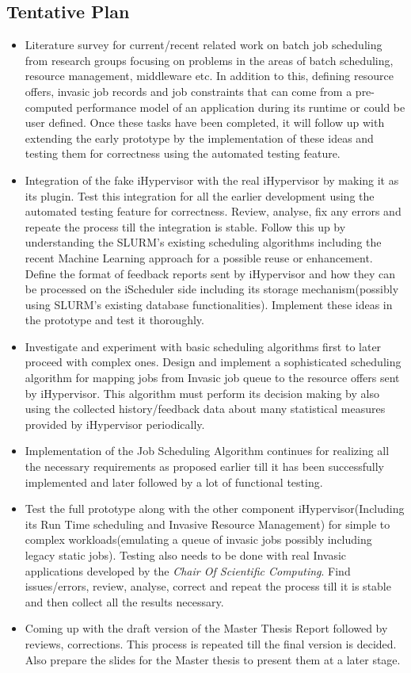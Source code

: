 \subsection{Tentative Plan}
\begin{itemize}
\item Literature survey for current/recent related work on batch job scheduling from research groups focusing on problems in the areas of batch scheduling, resource management, middleware etc. In addition to this, defining resource offers, invasic job records and job constraints that can come from a pre-computed performance model of an application during its runtime or could be user defined. Once these tasks have been completed, it will follow up with extending the early prototype by the implementation of these ideas and testing them for correctness using the automated testing feature.
\item Integration of the fake iHypervisor with the real iHypervisor by making it as its plugin. Test this integration for all the earlier development using the automated testing feature for correctness. Review, analyse, fix any errors and repeate the process till the integration is stable. Follow this up by understanding the SLURM's existing scheduling algorithms including the recent Machine Learning approach for a possible reuse or enhancement. Define the format of feedback reports sent by iHypervisor and how they can be processed on the iScheduler side including its storage mechanism(possibly using SLURM's existing database functionalities). Implement these ideas in the prototype and test it thoroughly.
\item Investigate and experiment with basic scheduling algorithms first to later proceed with complex ones. Design and implement a sophisticated scheduling algorithm for mapping jobs from Invasic job queue to the resource offers sent by iHypervisor. This algorithm must perform its decision making by also using the collected history/feedback data about many statistical measures provided by iHypervisor periodically.
\item Implementation of the Job Scheduling Algorithm continues for realizing all the necessary requirements as proposed earlier till it has been successfully implemented and later followed by a lot of functional testing.
\item Test the full prototype along with the other component iHypervisor(Including its Run Time scheduling and Invasive Resource Management) for simple to complex workloads(emulating a queue of invasic jobs possibly including legacy static jobs). Testing also needs to be done with real Invasic applications developed by the \textit{Chair Of Scientific Computing}. Find issues/errors, review, analyse, correct and repeat the process till it is stable and then collect all the results necessary.
\item Coming up with the draft version of the Master Thesis Report followed by reviews, corrections. This process is repeated till the final version is decided. Also prepare the slides for the Master thesis to present them at a later stage.
\end{itemize}
